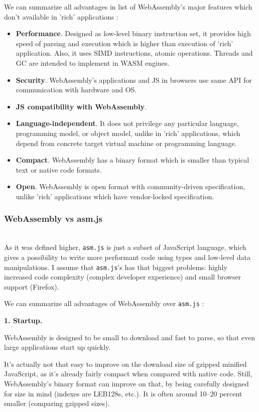 We can summarize all advantages in list of WebAssembly's major features which don't available in 'rich' applications :
\begin{itemize}  
  \item \textbf{Performance}. Designed as low-level binary instruction set, it provides high speed of parsing and execution which is higher than execution of 'rich' application. 
                Also, it uses SIMD instructions, atomic operations. Threads and GC are intended to implement in WASM engines. 
  \item \textbf{Security}. WebAssembly’s applications and JS in browsers use same API for communication with hardware and OS.
  \item \textbf{JS compatibility with WebAssembly}.
  \item \textbf{Language-independent}. It does not privilege any particular language, programming model, or object model, unlike in 'rich' applications, 
                which depend from concrete target virtual machine or programming language.
  \item \textbf{Compact}. WebAssembly has a binary format which is smaller than typical text or native code formats.
  \item \textbf{Open}. WebAssembly is open format with community-driven specification, unlike 'rich' applications which have vendor-locked specification.

\end{itemize}

\subsubsection{WebAssembly vs asm.js}\mbox{}\\
\indent As it was defined higher, \texttt{asm.js} is just a subset of JavaScript language, which gives a possibility to write more performant code using types and low-level data manipulations.
I assume that \texttt{asm.js}'s has that biggest problems: highly increased code complexity (complex developer experience) and small browser support (Firefox).

We can summarize all advantages of WebAssembly over \texttt{asm.js} \cite{wasm_asm}:

\textbf{1. Startup.}

WebAssembly is designed to be small to download and fast to parse, so that even large applications start up quickly.

It’s actually not that easy to improve on the download size of gzipped minified JavaScript, as it’s already fairly compact when compared with native code. Still, WebAssembly’s binary format can improve on that, by being carefully designed for size in mind (indexes are LEB128s, etc.). It is often around 10–20 percent smaller (comparing gzipped sizes).

